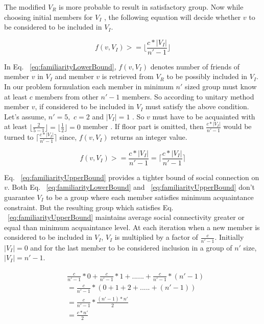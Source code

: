 \documentclass{vldb}
\begin{document}
		The modified $ V_R $ is more probable to result in satisfactory group. Now while choosing initial members for $ V_I $ , the following equation will decide whether $ v $ to be considered to be included in $ V_I $. 
		
		\begin{equation}
			\label{eq:familiarityLowerBound}
			f(v,V_I)>= \bigg\lfloor\frac{c*|V_I|}{n'-1}\bigg\rfloor
		\end{equation}
		
		In Eq. ~\ref{eq:familiarityLowerBound}, $ f(v,V_I) $ denotes number of friends of member $ v $ in $ V_I $ and  member $ v $ is retrieved from $ V_R $ to be possibly included in $ V_I $. In our problem formulation each member in minimum $ n' $ sized group must know at least $ c $ members from other $ n'-1 $ members. So according to unitary method member $ v $, if considered to be included in $ V_I $ must satisfy the above condition. Let's assume, $ n'=5, $  $ c=2 $ and $ |V_I|=1 $ . So $ v $ must have to be acquainted with at least $ \lfloor\frac{2}{5-1} \rfloor=\lfloor\frac{1}{2} \rfloor = 0$ member . If floor part is omitted, then $ \frac{c*|V_I|}{n'-1} $ would be turned to $ \big\lceil\frac{c*|V_I|}{n'-1}\big\rceil $ since, $ f(v,V_I) $ returns an integer value. 
		
		\begin{equation}
			\label{eq:familiarityUpperBound}
			f(v,V_I)>=\frac{c*|V_I|}{n'-1}= \bigg\lceil\frac{c*|V_I|}{n'-1}\bigg\rceil
		\end{equation}

		Eq. ~\ref{eq:familiarityUpperBound}		provides a tighter bound of social connection on $ v $. Both Eq. ~\ref{eq:familiarityLowerBound} and ~\ref{eq:familiarityUpperBound} don't guarantee $ V_I $ to be  a group where each member satisfies minimum acquaintance constraint. But the resulting group which satisfies  Eq. ~\ref{eq:familiarityUpperBound} maintains average social connectivity greater or equal than minimum acquaintance level. 
		At each iteration when a new member is considered to be included in $ V_I $, $ V_I $ is multiplied by a factor of $ \frac{c}{n'-1} $. Initially $ |V_I|=0 $ and for the last member to be considered inclusion in a group of $ n' $ size, $ |V_I|=n'-1 $.
		
		\begin{equation*}
		\begin{aligned}
		\begin{split}
			&\frac{c}{n'-1}*0+\frac{c}{n'-1}*1+......+\frac{c}{n'-1}*(n'-1)\\
			&= \frac{c}{n'-1}*(0+1+2+.....+(n'-1))\\
			&= \frac{c}{n'-1}*\frac{(n'-1)*n'}{2}\\
			&= \frac{c*n'}{2}
						\end{split}
		\end{aligned}
		\end{equation*}
		
\end{document}
